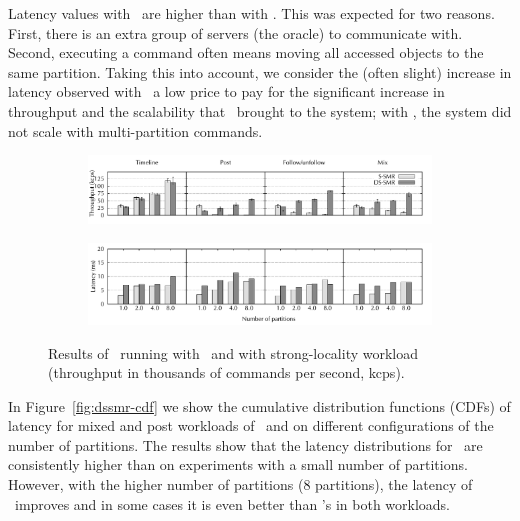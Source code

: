 Latency values with \dssmr\ are higher than with \ssmr{}. This was expected for
two reasons. First, there is an extra group of servers (the oracle) to
communicate with. Second, executing a command often means moving all accessed
objects to the same partition. Taking this into account, we consider the (often
slight) increase in latency observed with \dssmr\ a low price to pay for the
significant increase in throughput and the scalability that \dssmr\ brought to
the system; with \ssmr{}, the system did not scale with multi-partition
commands.


\begin{figure}[ht!]
\centering
\begin{subfigure}{1\columnwidth}
      \centering
      \includegraphics[width=\textwidth]{./figures/experiments/dssmr/dssmr-strong-locality-tp}
\end{subfigure}
\begin{subfigure}{1\columnwidth}
      \centering
      \includegraphics[width=\textwidth]{./figures/experiments/dssmr/dssmr-strong-locality-lat}
\end{subfigure}
\caption{Results of \dssmrappname\ running with \ssmr\ and \dssmr{} with strong-locality workload (throughput in thousands of commands per second, kcps).}
\label{fig:dssmr-strongloc}
\end{figure}

In Figure~\ref{fig:dssmr-cdf} we show the cumulative distribution functions
(CDFs) of latency for mixed and post workloads of \dssmr\ and \ssmr on different
configurations of the number of partitions. The results show that the latency
distributions for \dssmr\ are consistently higher than \ssmr on experiments with a small
number of partitions. However, with the higher number of partitions (8
partitions), the latency of \dssmr\ improves and in some cases it is even better than \ssmr's in 
both workloads. 

